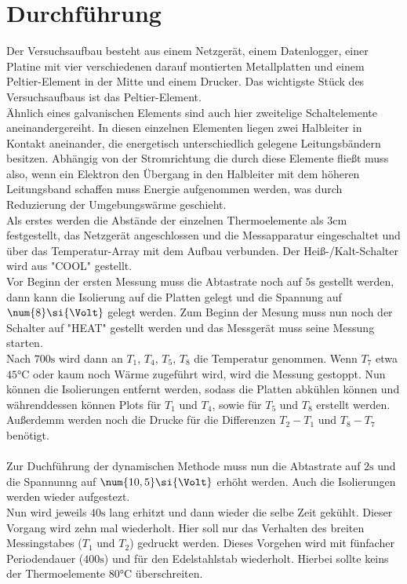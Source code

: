 \section{Durchführung}

Der Versuchsaufbau besteht aus einem Netzgerät,
einem Datenlogger, einer Platine mit vier verschiedenen darauf montierten Metallplatten und
einem Peltier-Element in der Mitte und einem Drucker.
Das wichtigste Stück des Versuchsaufbaus ist das Peltier-Element.\\
Ähnlich eines galvanischen Elements sind auch hier zweitelige
Schaltelemente aneinandergereiht.
In diesen einzelnen Elementen liegen zwei Halbleiter in Kontakt aneinander, die energetisch unterschiedlich gelegene Leitungsbändern besitzen.
Abhängig von der Stromrichtung die durch diese Elemente fließt muss also, 
wenn ein Elektron den Übergang in den Halbleiter mit dem höheren Leitungsband schaffen muss Energie aufgenommen werden,
was durch Reduzierung der Umgebungswärme geschieht.\\

Als erstes werden die Abstände der einzelnen Thermoelemente
als $\num{3}\si{\centi\metre}$ festgestellt, das Netzgerät
angeschlossen und die Messapparatur eingeschaltet und
über das Temperatur-Array mit dem Aufbau verbunden. 
Der Heiß-/Kalt-Schalter wird aus "COOL" gestellt.\\
Vor Beginn der ersten Messung muss die Abtastrate noch auf $\num{5}\si{\second}$ gestellt werden, dann kann die Isolierung auf die Platten gelegt und die Spannung auf $\num{8}\si{\Volt}$
gelegt werden. Zum Beginn der Mesung muss nun noch der Schalter auf "HEAT" gestellt werden und
das Messgerät muss seine Messung starten.\\
Nach $\num{700}\si{\second}$ wird dann an $T_1$,
$T_4$, $T_5$, $T_8$ die Temperatur genommen.
Wenn $T_7$ etwa $\num{45}\si{\degreeCelsius}$
oder kaum noch Wärme zugeführt wird, wird die Messung gestoppt.
Nun können die Isolierungen entfernt werden,
sodass die Platten abkühlen können und
währenddessen können Plots für $T_1$ und $T_4$,
sowie für $T_5$ und $T_8$ erstellt werden.
Außerdemm werden noch die Drucke für die Differenzen $T_2-T_1$
und $T_8-T_7$ benötigt.\\
\\
Zur Duchführung der dynamischen Methode muss nun die
Abtastrate auf $\num{2}\si{\second}$ und
die Spannunng auf $\num{10,5}\si{\Volt}$ erhöht werden.
Auch die Isolierungen werden wieder aufgestezt.\\
Nun wird jeweils $\num{40}\si{\second}$ lang erhitzt und dann wieder die selbe Zeit gekühlt. Dieser Vorgang wird zehn mal wiederholt.
Hier soll nur das Verhalten des breiten Messingstabes ($T_1$ und $T_2$) gedruckt werden.
Dieses Vorgehen wird mit fünfacher Periodendauer
($\num{400}\si{\second}$) und für den Edelstahlstab wiederholt.
Hierbei sollte keins der Thermoelemente $\num{80}\si{\degreeCelsius}$ überschreiten.


